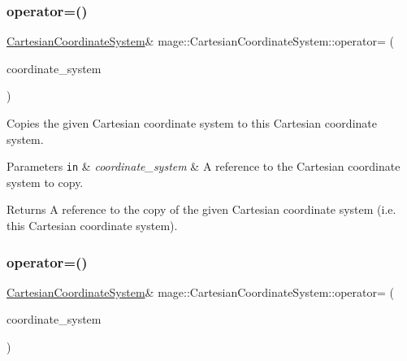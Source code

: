 \subsubsection{\texorpdfstring{operator=()}{operator=()}\hspace{0.1cm}{\footnotesize\ttfamily [1/2]}}
{\footnotesize\ttfamily \hyperlink{structmage_1_1_cartesian_coordinate_system}{Cartesian\+Coordinate\+System}\& mage\+::\+Cartesian\+Coordinate\+System\+::operator= (\begin{DoxyParamCaption}\item[{const \hyperlink{structmage_1_1_cartesian_coordinate_system}{Cartesian\+Coordinate\+System} \&}]{coordinate\+\_\+system }\end{DoxyParamCaption})\hspace{0.3cm}{\ttfamily [default]}}

Copies the given Cartesian coordinate system to this Cartesian coordinate system.


\begin{DoxyParams}[1]{Parameters}
\mbox{\tt in}  & {\em coordinate\+\_\+system} & A reference to the Cartesian coordinate system to copy. \\
\hline
\end{DoxyParams}
\begin{DoxyReturn}{Returns}
A reference to the copy of the given Cartesian coordinate system (i.\+e. this Cartesian coordinate system). 
\end{DoxyReturn}
\hypertarget{structmage_1_1_cartesian_coordinate_system_afc51347ff3f42576c483c76f5747c4c6}{}\label{structmage_1_1_cartesian_coordinate_system_afc51347ff3f42576c483c76f5747c4c6} 
\subsubsection{\texorpdfstring{operator=()}{operator=()}\hspace{0.1cm}{\footnotesize\ttfamily [2/2]}}
{\footnotesize\ttfamily \hyperlink{structmage_1_1_cartesian_coordinate_system}{Cartesian\+Coordinate\+System}\& mage\+::\+Cartesian\+Coordinate\+System\+::operator= (\begin{DoxyParamCaption}\item[{\hyperlink{structmage_1_1_cartesian_coordinate_system}{Cartesian\+Coordinate\+System} \&\&}]{coordinate\+\_\+system }\end{DoxyParamCaption})\hspace{0.3cm}{\ttfamily [default]}}

